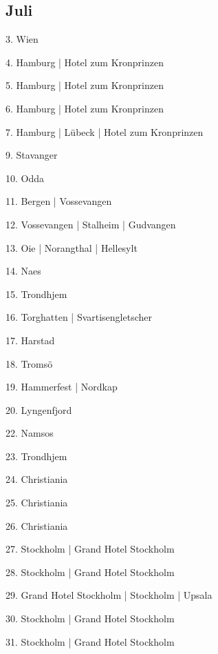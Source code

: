 \documentclass[twoside=false,titlepage=false,open=any, parskip=never, fontsize=10pt, headings=small, chapterprefix=false, appendixprefix=false, DIV=15]{scrbook}
\begin{document}
\begin{multicols}{3}
            \section*{Juli}
            3. Wien\par
            4. Hamburg | Hotel zum Kronprinzen\par
            5. Hamburg | Hotel zum Kronprinzen\par
            6. Hamburg | Hotel zum Kronprinzen\par
            7. Hamburg | Lübeck | Hotel zum Kronprinzen\par
            9. Stavanger\par
            10. Odda\par
            11. Bergen | Vossevangen\par
            12. Vossevangen | Stalheim | Gudvangen\par
            13. Oie | Norangthal | Hellesylt\par
            14. Naes\par
            15. Trondhjem\par
            16. Torghatten | Svartisengletscher\par
            17. Harstad\par
            18. Tromsö\par
            19. Hammerfest | Nordkap\par
            20. Lyngenfjord\par
            22. Namsos\par
            23. Trondhjem\par
            24. Christiania\par
            25. Christiania\par
            26. Christiania\par
            27. Stockholm | Grand Hotel Stockholm\par
            28. Stockholm | Grand Hotel Stockholm\par
            29. Grand Hotel Stockholm | Stockholm | Upsala\par
            30. Stockholm | Grand Hotel Stockholm\par
            31. Stockholm | Grand Hotel Stockholm\par

\end{multicols}
\end{document}
